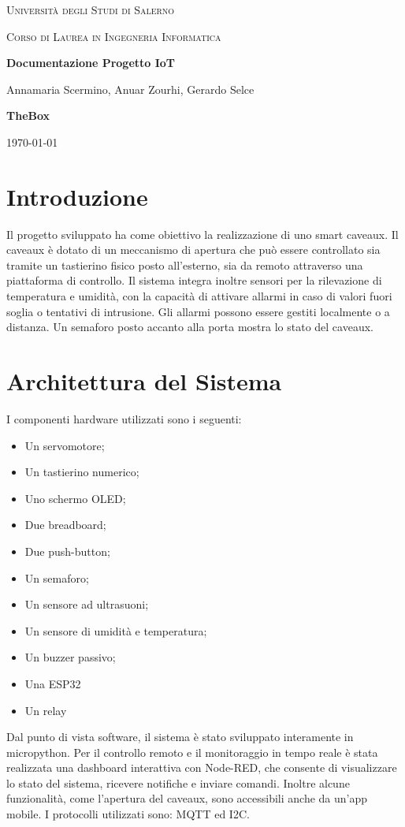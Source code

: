 \documentclass[12pt,a4paper]{article}
\begin{document}
	
	\begin{titlepage}
		\centering
		{\scshape\LARGE Università degli Studi di Salerno \par}
		\vspace{1cm}
		{\scshape\Large Corso di Laurea in Ingegneria Informatica\par}
		\vspace{2cm}
		{\huge\bfseries Documentazione Progetto IoT\par}
		\vspace{1.5cm}
		{\Large Annamaria Scermino, Anuar Zourhi, Gerardo Selce \par}
		\vspace{1.5cm}
		{\huge\bfseries TheBox\par}
		\vfill
		{\large \today\par}
	\end{titlepage}
	
	\tableofcontents
	\newpage
	
	\section{Introduzione}
	Il progetto sviluppato ha come obiettivo la realizzazione di uno smart caveaux. Il caveaux è dotato di un meccanismo di apertura che può essere controllato sia tramite un tastierino fisico posto all’esterno, sia da remoto attraverso una piattaforma di controllo. Il sistema integra inoltre sensori per la rilevazione di temperatura e umidità, con la capacità di attivare allarmi in caso di valori fuori soglia o tentativi di intrusione. Gli allarmi possono essere gestiti localmente o a distanza. Un semaforo posto accanto alla porta mostra lo stato del caveaux.
	
	\section{Architettura del Sistema}
	I componenti hardware utilizzati sono i seguenti:
	\begin{itemize}
		\item Un servomotore;
		\item Un tastierino numerico;
		\item Uno schermo OLED;
		\item Due breadboard;
		\item Due push-button;
		\item Un semaforo;
		\item Un sensore ad ultrasuoni;
		\item Un sensore di umidità e temperatura;
		\item Un buzzer passivo;
		\item Una ESP32
		\item Un relay 
	\end{itemize}
	Dal punto di vista software, il sistema è stato sviluppato interamente in micropython. Per il controllo remoto e il monitoraggio in tempo reale è stata realizzata una dashboard interattiva con Node-RED, che consente di visualizzare lo stato del sistema, ricevere notifiche e inviare comandi. Inoltre alcune funzionalità, come l'apertura del caveaux, sono accessibili anche da un'app mobile. I protocolli utilizzati sono: MQTT ed I2C.
	
\end{document}
